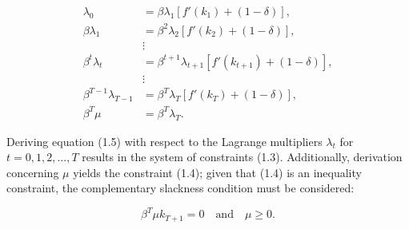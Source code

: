 \documentclass[12pt]{article}
\begin{document}
\begin{equation}
    \begin{aligned}
        \lambda_0 &= \beta \lambda_1 \left[ f'(k_1) + (1 - \delta) \right], \\
        \beta \lambda_1 &= \beta^2 \lambda_2 \left[ f'(k_2) + (1 - \delta) \right], \\
        & \vdots \\
        \beta^t \lambda_t &= \beta^{t+1} \lambda_{t+1} \left[ f'(k_{t+1}) + (1 - \delta) \right], \\
        & \vdots \\
        \beta^{T-1} \lambda_{T-1} &= \beta^T \lambda_T \left[ f'(k_T) + (1 - \delta) \right], \\
        \beta^T \mu &= \beta^T \lambda_T.
    \end{aligned}
\end{equation}



Deriving equation (1.5) with respect to the Lagrange multipliers \(\lambda_t\) for \(t=0,1,2,\ldots,T\) results in the
system  of constraints (1.3). Additionally, derivation concerning \(\mu\) yields the constraint (1.4); given that (1.4)
is an inequality constraint, the complementary slackness condition must be considered:

\[
\beta^T \mu k_{T+1} = 0 \quad \text{and} \quad \mu \geq 0.
\]
\end{document}
